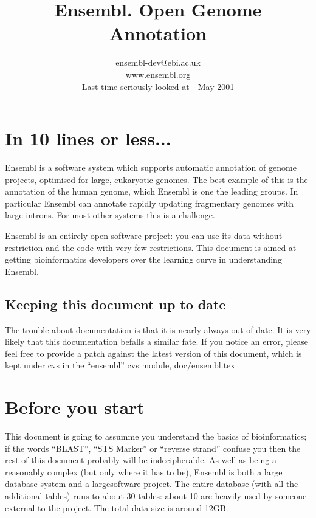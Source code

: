 \documentclass[11pt,a4paper]{article}
\begin{document}
\title{Ensembl. Open Genome Annotation}
\author{ensembl-dev@ebi.ac.uk\\www.ensembl.org\\Last time seriously looked at - May 2001}


\maketitle

\newpage
\tableofcontents
\newpage

 
\newpage

\section{In 10 lines or less...}

Ensembl is a software system which supports automatic annotation of
genome projects, optimised for large, eukaryotic genomes. The best
example of this is the annotation of the human genome, which Ensembl
is one the leading groups. In particular Ensembl can annotate rapidly
updating fragmentary genomes with large introns. For most other systems
this is a challenge.

Ensembl is an entirely open software project: you can use its data
without restriction and the code with very few restrictions. This
document is aimed at getting bioinformatics developers over the
learning curve in understanding Ensembl.

\subsection{Keeping this document up to date}

The trouble about documentation is that it is nearly always out of
date. It is very likely that this documentation befalls a similar fate.
If you notice an error, please feel free to provide a patch against
the latest version of this document, which is kept under cvs in 
the ``ensembl'' cvs module, doc/ensembl.tex

\section{Before you start}

This document is going to assumme you understand the basics of
bioinformatics; if the words ``BLAST'', ``STS Marker'' or ``reverse
strand'' confuse you then the rest of this document probably will be
indecipherable. As well as being a reasonably complex (but only where
it has to be), Ensembl is both a large database system and a
largesoftware project. The entire database (with all the additional
tables) runs to about 30 tables: about 10 are heavily used by someone
external to the project. The total data size is around 12GB. 
\end{document}
